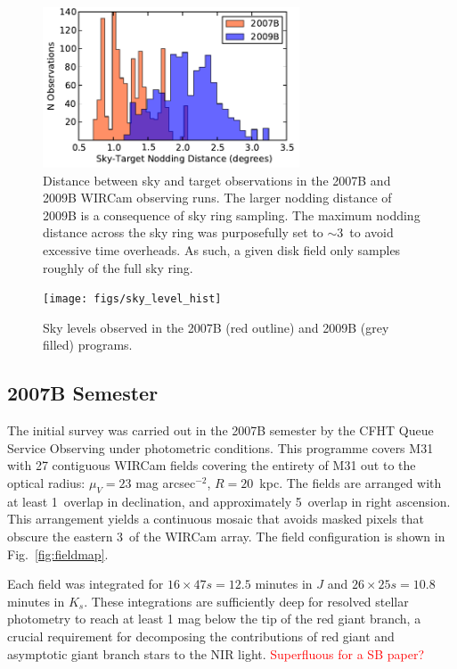 \documentclass[iop]{emulateapj}
\newcommand{\changeit}[1]{\textcolor{red}{#1}} %
\newcommand{\Fig}[1]{Fig.~\ref{fig:#1}}  %
\begin{document}
\begin{figure}[t]
    \centering
        \includegraphics[width=3in]{figs/sky_target_dist}
    \caption{Distance between sky and target observations in the 2007B and 2009B WIRCam observing runs. The larger nodding distance of 2009B is a consequence of sky ring sampling. The maximum nodding distance across the sky ring was purposefully set to $\sim 3$\arcdeg\ to avoid excessive time overheads. As such, a given disk field only samples roughly of the full sky ring.}
    \label{fig:sky_target_dist}
\end{figure}

\begin{figure}[t]
    \centering
        \texttt{[image: figs/sky\_level\_hist]}
    \caption{Sky levels observed in the 2007B (red outline) and 2009B (grey filled) programs.}
    \label{fig:net_sky_level}
\end{figure}

\subsection{2007B Semester} %
\label{sec:obs7}

The initial survey was carried out in the 2007B semester by the CFHT Queue Service Observing under photometric conditions. This programme covers M31 with 27 contiguous WIRCam fields covering the entirety of M31 out to the optical radius: $\mu_V=23$ mag arcsec$^{-2}$, $R=20$~kpc. The fields are arranged with at least 1\arcmin\ overlap in declination, and approximately 5\arcmin\ overlap in right ascension.
This arrangement yields a continuous mosaic that avoids masked pixels that obscure the eastern 3\arcmin\ of the WIRCam array. The field configuration is shown in \Fig{fieldmap}.

Each field was integrated for $16\times 47 s = 12.5$ minutes in $J$ and $26\times 25 s = 10.8$ minutes in $K_s$. These integrations are sufficiently deep for resolved stellar photometry to reach at least 1 mag below the tip of the red giant branch, a crucial requirement for decomposing the contributions of red giant and asymptotic giant branch stars to the NIR light. \changeit{Superfluous for a SB paper?}
\end{document}
